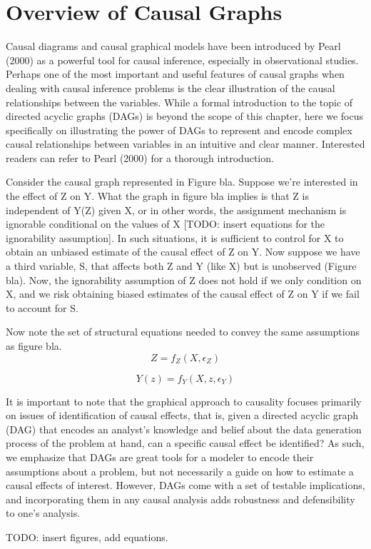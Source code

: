 \section{Overview of Causal Graphs}

Causal diagrams and causal graphical models have been introduced by Pearl 
(2000) as a powerful tool for causal inference, especially in observational 
studies. Perhaps one of the most important and useful features of causal 
graphs when dealing with causal inference problems is the clear illustration 
of the causal relationships between the variables. 
While a formal introduction to the topic of directed acyclic graphs (DAGs) is beyond the scope of this chapter, 
here we focus specifically on illustrating the power of DAGs to represent 
and encode complex  causal relationships between variables in an intuitive and 
clear manner. Interested readers can refer to Pearl (2000) for a thorough introduction. 


Consider the causal graph represented in Figure bla. Suppose we're interested 
in the effect of Z on Y. What the graph in figure bla implies is that Z is 
independent of Y(Z) given X, or in other words, the assignment mechanism is 
ignorable conditional on the values of X [TODO: insert equations for the 
ignorability assumption]. In such situations, it is sufficient to control for 
X to obtain an unbiased estimate of the causal effect of Z on Y. Now suppose 
we have a third variable, S, that affects both Z and Y (like X) but is 
unobserved (Figure bla). Now, the ignorability assumption of Z does not hold 
if we only condition on X, and we risk obtaining biased estimates of the 
causal effect of Z on Y if we fail to account for S. 

Now note the set of structural equations needed to convey the same assumptions as figure bla. 
\[Z = f_Z(X, \epsilon_Z)  \]

\[Y(z) = f_Y(X, z, \epsilon_Y)  \]


It is important to note that the graphical approach to causality focuses 
primarily on issues of identification of causal effects, that is, given a 
directed acyclic graph (DAG) that encodes an analyst's knowledge and belief 
about the data generation process of the problem at hand, can a specific 
causal effect be identified? As such, we emphasize that DAGs are great tools 
for a modeler to encode their assumptions about a problem, but not necessarily 
a guide on how to estimate a causal effects of interest. However, DAGs come 
with a set of testable implications, and incorporating them in any causal 
analysis adds robustness and defensibility to one's analysis. 

TODO: insert figures, add equations. 




\blindtext[2]